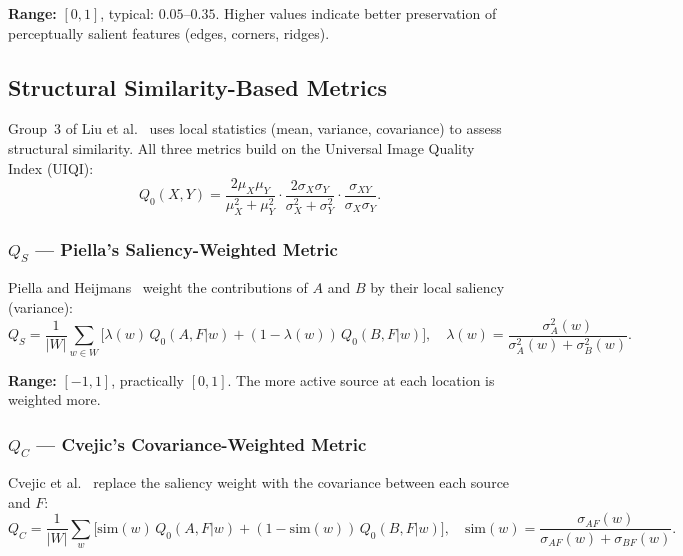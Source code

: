 \documentclass[a4paper,12pt]{article}
\begin{document}
\textbf{Range:} $[0,1]$, typical: $0.05$--$0.35$.
Higher values indicate better preservation of perceptually salient features
(edges, corners, ridges).

\subsection{Structural Similarity-Based Metrics}

Group~3 of Liu et al.~\cite{liu2012} uses local statistics (mean, variance,
covariance) to assess structural similarity. All three metrics build on the
Universal Image Quality Index (UIQI):
\begin{equation}
  Q_0(X,Y) = \frac{2\mu_X \mu_Y}{\mu_X^2 + \mu_Y^2} \cdot
              \frac{2\sigma_X \sigma_Y}{\sigma_X^2 + \sigma_Y^2} \cdot
              \frac{\sigma_{XY}}{\sigma_X \sigma_Y}.
\end{equation}

\subsubsection{$Q_S$ --- Piella's Saliency-Weighted Metric}

Piella and Heijmans~\cite{piella2003} weight the contributions of $A$ and $B$
by their local saliency (variance):
\begin{equation}
  Q_S = \frac{1}{|W|} \sum_{w \in W}
    \bigl[\lambda(w) \, Q_0(A, F|w) + (1 - \lambda(w)) \, Q_0(B, F|w)\bigr], \quad
  \lambda(w) = \frac{\sigma_A^2(w)}{\sigma_A^2(w) + \sigma_B^2(w)}.
\end{equation}

\textbf{Range:} $[-1, 1]$, practically $[0, 1]$.
The more active source at each location is weighted more.

\subsubsection{$Q_C$ --- Cvejic's Covariance-Weighted Metric}

Cvejic et al.~\cite{cvejic2005} replace the saliency weight with the
covariance between each source and $F$:
\begin{equation}
  Q_C = \frac{1}{|W|} \sum_{w} \bigl[\text{sim}(w) \, Q_0(A,F|w) + (1 - \text{sim}(w)) \, Q_0(B,F|w)\bigr], \quad
  \text{sim}(w) = \frac{\sigma_{AF}(w)}{\sigma_{AF}(w) + \sigma_{BF}(w)}.
\end{equation}
\end{document}
